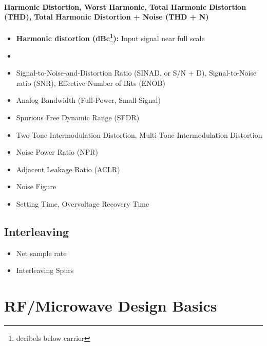 \paragraph{Harmonic Distortion, Worst Harmonic, Total Harmonic Distortion (THD), Total Harmonic Distortion + Noise (THD + N)}

\begin{itemize}
	\item \textbf{Harmonic distortion (dBc\footnote{decibels below carrier}):} Input signal near full scale
\end{itemize}

\begin{itemize}
\item 
\item Signal-to-Noise-and-Distortion Ratio (SINAD, or S/N + D), Signal-to-Noise ratio (SNR), Effective Number of Bits (ENOB)
\item Analog Bandwidth (Full-Power, Small-Signal)
\item Spurious Free Dynamic Range (SFDR)
\item Two-Tone Intermodulation Distortion, Multi-Tone Intermodulation Distortion
\item Noise Power Ratio (NPR)
\item Adjacent Leakage Ratio (ACLR)
\item Noise Figure
\item Setting Time, Overvoltage Recovery Time
\end{itemize}

\cite{walt}
\subsection{Interleaving}

\begin{itemize}
\item Net sample rate
\item Interleaving Spurs
\end{itemize}

\cite{mangrob}




\newpage
\section{RF/Microwave Design Basics}